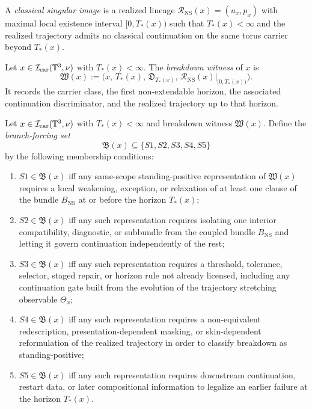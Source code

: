 \begin{definition}\label{def:classical-singular-image}
A \emph{classical singular image} is a realized lineage $\mathcal R_{\mathrm{NS}}(x)=(u_x,p_x)$ with
maximal local existence interval $[0,T_*(x))$ such that $T_*(x)<\infty$ and the realized trajectory
admits no classical continuation on the same torus carrier beyond $T_*(x)$.
\end{definition}

\begin{definition}\label{def:breakdown-witness}
Let $x\in\mathcal I_{\mathrm{car}}(\mathbb{T}^3,\nu)$ with $T_*(x)<\infty$. The \emph{breakdown witness} of $x$ is
\[
\mathfrak W(x):=\bigl(x,\,T_*(x),\,\mathfrak D_{T_*(x)},\,\mathcal R_{\mathrm{NS}}(x)|_{[0,T_*(x))}\bigr).
\]
It records the carrier class, the first non-extendable horizon, the associated continuation discriminator, and the realized trajectory up to that horizon.
\end{definition}

\begin{definition}\label{def:branch-forcing-set}
Let $x\in\mathcal I_{\mathrm{car}}(\mathbb{T}^3,\nu)$ with $T_*(x)<\infty$ and breakdown witness $\mathfrak W(x)$.
Define the \emph{branch-forcing set}
\[
\mathfrak B(x)\subseteq\{S1,S2,S3,S4,S5\}
\]
by the following membership conditions:
\begin{enumerate}[label=(S\arabic*), leftmargin=2.2em]
\item $S1\in\mathfrak B(x)$ iff any same-scope standing-positive representation of $\mathfrak W(x)$ requires a local weakening, exception, or relaxation of at least one clause of the bundle $B_{\mathrm{NS}}$ at or before the horizon $T_*(x)$;
\item $S2\in\mathfrak B(x)$ iff any such representation requires isolating one interior compatibility, diagnostic, or subbundle from the coupled bundle $B_{\mathrm{NS}}$ and letting it govern continuation independently of the rest;
\item $S3\in\mathfrak B(x)$ iff any such representation requires a threshold, tolerance, selector, staged repair, or horizon rule not already licensed, including any continuation gate built from the evolution of the trajectory stretching observable $\Theta_x$;
\item $S4\in\mathfrak B(x)$ iff any such representation requires a non-equivalent redescription, presentation-dependent masking, or skin-dependent reformulation of the realized trajectory in order to classify breakdown as standing-positive;
\item $S5\in\mathfrak B(x)$ iff any such representation requires downstream continuation, restart data, or later compositional information to legalize an earlier failure at the horizon $T_*(x)$.
\end{enumerate}
\end{definition}

